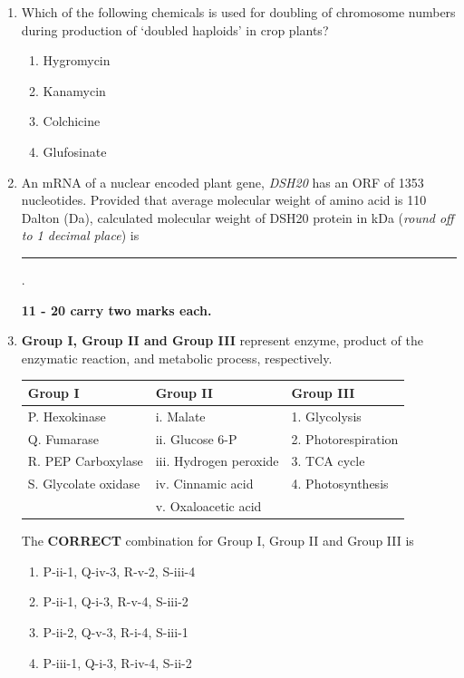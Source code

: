 \documentclass[journal,12pt,onecolumn]{IEEEtran}
\begin{document}
\begin{enumerate}[label=\arabic*.]
\item Which of the following chemicals is used for doubling of chromosome numbers during production of ‘doubled haploids’ in crop plants?
\begin{multicols}{2}
\begin{enumerate}[label=(\Alph*)]
    \item Hygromycin
    \item Kanamycin
    \item Colchicine
    \item Glufosinate
\end{enumerate}
\end{multicols}
\item An mRNA of a nuclear encoded plant gene, \textit{DSH20} has an ORF of 1353 nucleotides. Provided that average molecular weight of amino acid is 110 Dalton (Da), calculated molecular weight of DSH20 protein in kDa (\textit{round off to 1 decimal place}) is \rule{3cm}{0.1pt}.

\noindent \textbf{11 - 20 carry two marks each.}

\item \textbf{Group I, Group II and Group III} represent enzyme, product of the enzymatic reaction, and metabolic process, respectively.

\begin{center}
\begin{tabular}{|l|l|l|}
\hline
Group I & Group II & Group III \\
\hline
P. Hexokinase      & i. Malate             & 1. Glycolysis \\
Q. Fumarase        & ii. Glucose 6-P       & 2. Photorespiration \\
R. PEP Carboxylase & iii. Hydrogen peroxide & 3. TCA cycle \\
S. Glycolate oxidase & iv. Cinnamic acid    & 4. Photosynthesis \\
                   & v. Oxaloacetic acid   & \\
\hline
\end{tabular}
\end{center}

The \textbf{CORRECT} combination for Group I, Group II and Group III is
\begin{multicols}{2}
\begin{enumerate}[label=(\Alph*)]
    \item P-ii-1, Q-iv-3, R-v-2, S-iii-4
    \item P-ii-1, Q-i-3, R-v-4, S-iii-2
    \item P-ii-2, Q-v-3, R-i-4, S-iii-1
    \item P-iii-1, Q-i-3, R-iv-4, S-ii-2
\end{enumerate}
\end{multicols}


\end{enumerate}
\end{document}

